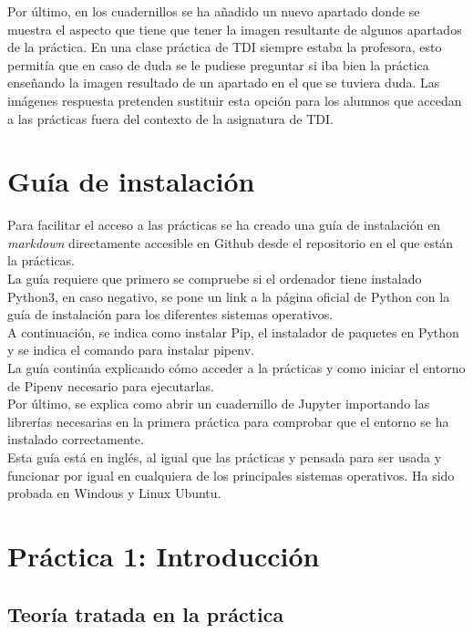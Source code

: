 \documentclass[a4paper,12pt]{report}
\begin{document}
Por último, en los cuadernillos se ha añadido un nuevo apartado donde se muestra el aspecto que tiene que tener la imagen resultante de algunos apartados de la práctica. En una clase práctica de TDI siempre estaba la profesora, esto permitía que en caso de duda se le pudiese preguntar si iba bien la práctica enseñando la imagen resultado de un apartado en el que se tuviera duda. Las imágenes respuesta pretenden sustituir esta opción para los alumnos que accedan a las prácticas fuera del contexto de la asignatura de TDI.


\section{Guía de instalación}

Para facilitar el acceso a las prácticas se ha creado una guía de instalación en \emph{markdown} directamente accesible en Github desde el repositorio en el que están la prácticas.\\

La guía requiere que primero se compruebe si el ordenador tiene instalado Python3, en caso negativo, se pone un link a la página oficial de Python con la guía de instalación para los diferentes sistemas operativos.\\

A continuación, se indica como instalar Pip, el instalador de paquetes en Python y se indica el comando para instalar pipenv.\\

La guía continúa explicando cómo acceder a la prácticas y como iniciar el entorno de Pipenv necesario para ejecutarlas.\\

Por último, se explica como abrir un cuadernillo de Jupyter importando las librerías necesarias en la primera práctica para comprobar que el entorno se ha instalado correctamente.\\

Esta guía está en inglés, al igual que las prácticas y pensada para ser usada y funcionar por igual en cualquiera de los principales sistemas operativos. Ha sido probada en Windous y Linux Ubuntu.\\

\section{ Práctica 1: Introducción}

\subsection{Teoría tratada en la práctica}
\end{document}
